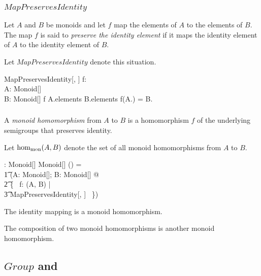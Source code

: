 \documentclass[12pt]{article}
\begin{document}
\subsubsection{$MapPreservesIdentity$}

Let $A$ and $B$ be monoids and let $f$ map the elements of $A$ to the elements of $B$.
The map $f$ is said to {\em preserve the identity element} if it maps the identity element of $A$
to the identity element of $B$.

Let $MapPreservesIdentity$ denote this situation.

\begin{schema}{MapPreservesIdentity}[\genT, \genU]
f: \genT \pfun \genU \\
A: Monoid[\genT] \\
B: Monoid[\genU]
\where
f \in A.elements \fun B.elements
\also
f(A.\oneG) = B.\oneG
\end{schema}

\subsubsection{}

A {\em monoid homomorphism} from $A$ to $B$ is a homomorphism $f$ of the underlying semigroups
that preserves identity.

Let $\operatorname{hom_{mon}}(A, B)$ denote the set of all monoid homomorphisms from $A$ to $B$.

\begin{gendef}[\genT, \genU]
\HomMonoid: Monoid[\genT] \cross Monoid[\genU] \fun \power (\genT \pfun \genU)
\where
\HomMonoid = \\
\t1	(\lambda A: Monoid[\genT]; B: Monoid[\genU] @ \\
\t2		\{~ f: \HomSemigroup(\MonoidSemigroup A, \MonoidSemigroup B) | \\
\t3			MapPreservesIdentity[\genT, \genU] ~\})
\end{gendef}

\begin{remark}
The identity mapping is a monoid homomorphism.
\end{remark}

\begin{remark}
The composition of two monoid homomorphisms is another monoid homomorphism.
\end{remark}

\subsection{$Group$ and }
\end{document}

